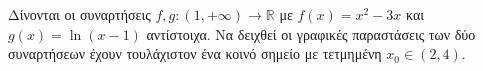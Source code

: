 Δίνονται οι συναρτήσεις $ f,g:(1,+\infty)\to\mathbb{R} $ με $ f(x)=x^2-3x $ και $ g(x)=\ln{(x-1)} $ αντίστοιχα. Να δειχθεί οι γραφικές παραστάσεις των δύο συναρτήσεων έχουν τουλάχιστον ένα κοινό σημείο με τετμημένη $ x_0\in(2,4) $.
